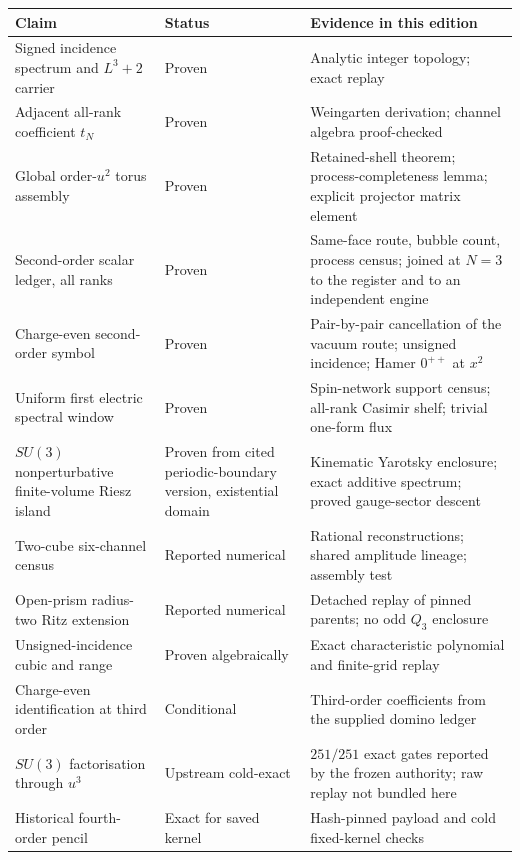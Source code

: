 \documentclass[11pt]{article}
\theoremstyle{plain}
\theoremstyle{definition}
\theoremstyle{remark}
\begin{document}
\begin{table}[ht]
\centering
\small
\begin{tabular}{@{}>{\raggedright\arraybackslash}p{}
                    >{\raggedright\arraybackslash}p{}
                    >{\raggedright\arraybackslash}p{}@{}}
\toprule
Claim & Status & Evidence in this edition \\
\midrule
Signed incidence spectrum and $L^3+2$ carrier
 & Proven & Analytic integer topology; exact replay \\
Adjacent all-rank coefficient $t_N$
 & Proven & Weingarten derivation; channel algebra proof-checked \\
Global order-$u^2$ torus assembly
 & Proven & Retained-shell theorem; process-completeness lemma; explicit projector matrix element \\
Second-order scalar ledger, all ranks
 & Proven & Same-face route, bubble count, process census; joined at $N=3$ to the register and to an independent engine \\
Charge-even second-order symbol
 & Proven & Pair-by-pair cancellation of the vacuum route; unsigned incidence; Hamer $0^{++}$ at $x^2$ \\
Uniform first electric spectral window
 & Proven & Spin-network support census; all-rank Casimir shelf; trivial one-form flux \\
$SU(3)$ nonperturbative finite-volume Riesz island
 & Proven from cited periodic-boundary version, existential domain
 & Kinematic Yarotsky enclosure; exact additive spectrum; proved gauge-sector descent \\
Two-cube six-channel census
 & Reported numerical & Rational reconstructions; shared amplitude lineage; assembly test \\
Open-prism radius-two Ritz extension
 & Reported numerical & Detached replay of pinned parents; no odd $Q_3$ enclosure \\
Unsigned-incidence cubic and range
 & Proven algebraically & Exact characteristic polynomial and finite-grid replay \\
Charge-even identification at third order
 & Conditional & Third-order coefficients from the supplied domino ledger \\
$SU(3)$ factorisation through $u^3$
 & Upstream cold-exact & $251/251$ exact gates reported by the frozen authority; raw replay not bundled here \\
Historical fourth-order pencil
 & Exact for saved kernel & Hash-pinned payload and cold fixed-kernel checks \\

\end{tabular}
\end{table}
\end{document}
